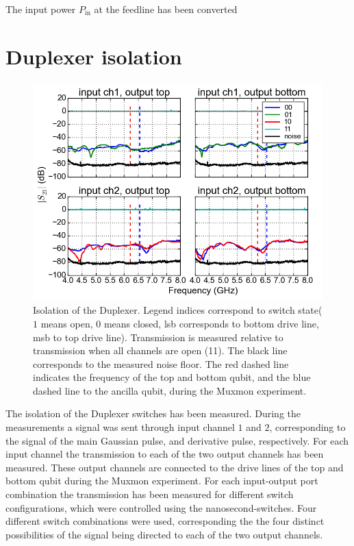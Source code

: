   The input power $P_\text{in}$ at the feedline has been converted

\chapter{Duplexer isolation}
  \label{ch:Duplexer isolation}

  \begin{figure}[h]
    \centering
    \includegraphics[width=\textwidth]{../Figures/Appendix/Duplexer isolation.png}
    \caption{Isolation of the Duplexer. Legend indices correspond to switch state($1$ means open, $0$ means closed, lsb corresponds to bottom drive line, msb to top drive line). Transmission is measured relative to transmission when all channels are open (11). The black line corresponds to the measured noise floor. The red dashed line indicates the frequency of the top and bottom qubit, and the blue dashed line to the ancilla qubit, during the Muxmon experiment.}
    \label{fig:Duplexer isolation}
  \end{figure}

  The isolation of the Duplexer switches has been measured. During the measurements a signal was sent through input channel $1$ and $2$, corresponding to the signal of the main Gaussian pulse, and derivative pulse, respectively. For each input channel the transmission to each of the two output channels has been measured. These output channels are connected to the drive lines of the top and bottom qubit during the Muxmon experiment. For each input-output port combination the transmission has been measured for different switch configurations, which were controlled using the nanosecond-switches. Four different switch combinations were used, corresponding the the four distinct possibilities of the signal being directed to each of the two output channels.

